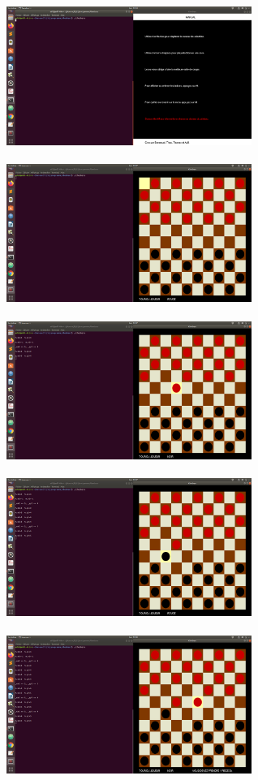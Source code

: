 \documentclass[a4paper]{article}
\begin{document}
\includegraphics[width = 8cm, height = 5cm]{menu.png}
\includegraphics[width = 8cm, height = 5cm]{premiertour1.png}
\bigbreak
\includegraphics[width = 8cm, height = 5cm]{premiertour2.png}
\includegraphics[width = 8cm, height = 5cm]{premiertour3.png}
\bigbreak
\includegraphics[width = 8cm, height = 5cm]{premiertour4.png}
\end{document}

